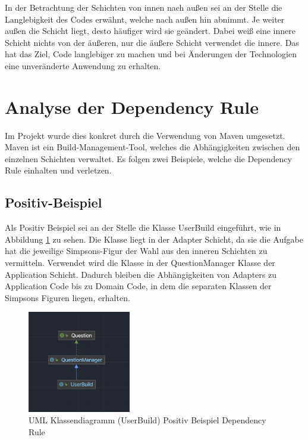In der Betrachtung der Schichten von innen nach außen sei an der Stelle die Langlebigkeit des Codes erwähnt, welche nach außen hin abnimmt. Je weiter außen die Schicht liegt, desto häufiger wird sie geändert. Dabei weiß eine innere Schicht nichts von der äußeren, nur die äußere Schicht verwendet die innere. Das hat das Ziel, Code langlebiger zu machen und bei Änderungen der Technologien eine unveränderte Anwendung zu erhalten. 
\newpage
\section{Analyse der Dependency Rule}
Im Projekt wurde dies konkret durch die Verwendung von Maven umgesetzt. Maven ist ein Build-Management-Tool, welches die Abhängigkeiten zwischen den einzelnen Schichten verwaltet. Es folgen zwei Beispiele, welche die Dependency Rule einhalten und verletzen.

\subsection{Positiv-Beispiel}
Als Positiv Beispiel sei an der Stelle die Klasse UserBuild eingeführt, wie in Abbildung \ref{fig:UserBuild} zu sehen. Die Klasse liegt in der Adapter Schicht, da sie die Aufgabe hat die jeweilige Simpsons-Figur der Wahl aus den inneren Schichten zu vermitteln. Verwendet wird die Klasse in der QuestionManager Klasse der Application Schicht. Dadurch bleiben die Abhängigkeiten von Adapters zu Application Code bis zu Domain Code, in dem die separaten Klassen der Simpsons Figuren liegen, erhalten.
\begin{figure}[ht]
    \centering
    \includegraphics[width=0.4\textwidth]{Bilder/UserBuild.png}
    \caption{UML Klassendiagramm (UserBuild) Positiv Beispiel Dependency Rule}
    \label{fig:UserBuild}
\end{figure}
\newpage

